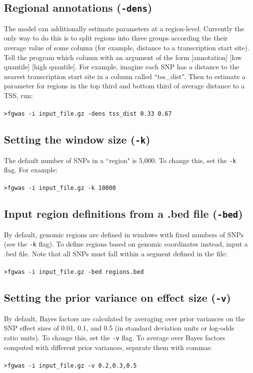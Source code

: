 \documentclass[11pt,titlepage]{article}
\begin{document}
\subsection{Regional annotations (\texttt{-dens})}
The model can additionally estimate parameters at a region-level. Currently the only way to do this is to split regions into three groups according the their average value of some column (for example, distance to a transcription start site). Tell the program which column with an argument of the form [annotation] [low quantile] [high quantile]. For example, imagine each SNP has a distance to the nearest transcription start site in a column called ``tss\_dist". Then to estimate a parameter for regions in the top third and bottom third of average distance to a TSS, run:
\\
\\
\noindent \texttt{>fgwas -i input\_file.gz -dens tss\_dist 0.33 0.67}

\subsection{Setting the window size (\texttt{-k})}
The default number of SNPs in a ``region" is 5,000. To change this, set the \texttt{-k} flag. For example:
\\
\\
\noindent \texttt{>fgwas -i input\_file.gz -k 10000}\\

\subsection{Input region definitions from a .bed file (\texttt{-bed})}
By default, genomic regions are defined in windows with fixed numbers of SNPs (see the \texttt{-k} flag). To define regions based on genomic coordinates instead, input a .bed file. Note that all SNPs must fall within a segment defined in the file:
\\
\\
\noindent \texttt{>fgwas -i input\_file.gz -bed regions.bed}\\


\subsection{Setting the prior variance on effect size (\texttt{-v})}
By default, Bayes factors are calculated by averaging over prior variances on the SNP effect sizes of 0.01, 0.1, and 0.5 (in standard deviation units or log-odds ratio units). To change this, set the \texttt{-v} flag. To average over Bayes factors computed with different prior variances, separate them with commas:
\\
\\
\noindent \texttt{>fgwas -i input\_file.gz -v 0.2,0.3,0.5}\\
\end{document}
